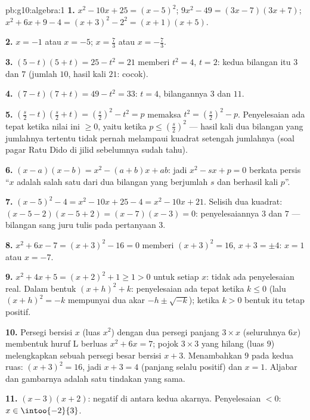\begin{solution}{pb:g10:algebra:1}
\textbf{1.} $x^2 - 10x + 25 = (x - 5)^2$;
$9x^2 - 49 = (3x - 7)(3x + 7)$;
$x^2 + 6x + 9 - 4 = (x + 3)^2 - 2^2 = (x + 1)(x + 5)$.

\textbf{2.} $x = -1$ atau $x = -5$; \quad $x = \frac73$ atau
$x = -\frac73$.

\textbf{3.} $(5 - t)(5 + t) = 25 - t^2 = 21$ memberi $t^2 = 4$,
$t = 2$: kedua bilangan itu $3$ dan $7$ (jumlah $10$, hasil kali
$21$: cocok).

\textbf{4.} $(7 - t)(7 + t) = 49 - t^2 = 33$: $t = 4$, bilangannya
$3$ dan $11$.

\textbf{5.} $\left(\frac s2 - t\right)\left(\frac s2 + t\right)
= \left(\frac s2\right)^2 - t^2 = p$ memaksa
$t^2 = \left(\frac s2\right)^2 - p$. Penyelesaian ada tepat
ketika nilai ini $\geq 0$, yaitu ketika
$p \leq \left(\frac s2\right)^2$ --- hasil kali dua bilangan
yang jumlahnya tertentu tidak pernah melampaui kuadrat setengah
jumlahnya (soal pagar Ratu Dido di jilid sebelumnya sudah tahu).

\textbf{6.} $(x - a)(x - b) = x^2 - (a + b)x + ab$: jadi
 $x^2 - sx + p = 0$ berkata persis ``$x$ adalah salah satu
dari dua bilangan yang berjumlah $s$ dan berhasil kali $p$''.

\textbf{7.} $(x-5)^2 - 4 = x^2 - 10x + 25 - 4 = x^2 - 10x +
21$. Selisih dua kuadrat:
$(x - 5 - 2)(x - 5 + 2) = (x - 7)(x - 3) = 0$: penyelesaiannya $3$
dan $7$ --- bilangan sang juru tulis pada pertanyaan 3.

\textbf{8.} $x^2 + 6x - 7 = (x + 3)^2 - 16 = 0$ memberi
$(x + 3)^2 = 16$, $x + 3 = \pm 4$: $x = 1$ atau $x = -7$.

\textbf{9.} $x^2 + 4x + 5 = (x + 2)^2 + 1 \geq 1 > 0$ untuk setiap
$x$: tidak ada penyelesaian real. Dalam bentuk $(x + h)^2 + k$:
penyelesaian ada tepat ketika $k \leq 0$ (lalu $(x+h)^2 = -k$ mempunyai
dua akar $-h \pm \sqrt{-k}$); ketika $k > 0$ bentuk itu tetap
positif.

\textbf{10.} Persegi bersisi $x$ (luas $x^2$) dengan dua
persegi panjang $3 \times x$ (seluruhnya $6x$) membentuk huruf L berluas
$x^2 + 6x = 7$; pojok $3 \times 3$ yang hilang (luas $9$)
melengkapkan sebuah persegi besar bersisi $x + 3$. Menambahkan $9$ pada
kedua ruas: $(x + 3)^2 = 16$, jadi $x + 3 = 4$ (panjang selalu positif)
dan $x = 1$. Aljabar dan gambarnya adalah satu tindakan yang sama.

\textbf{11.} $(x-3)(x+2)$: negatif di antara kedua akarnya. Penyelesaian
$< 0$: $x \in \intoo{-2}{3}$.


\end{solution}
